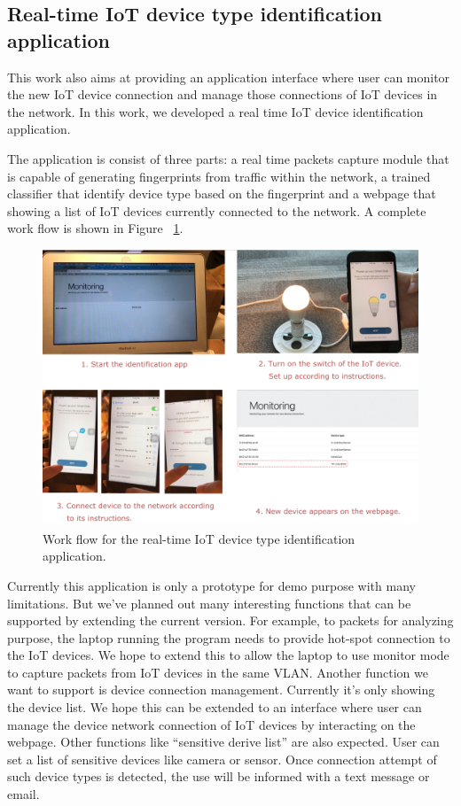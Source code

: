\documentclass[twocolumn,10pt]{article}
\begin{document}
\subsection{Real-time IoT device type identification application}

This work also aims at providing an application interface where user can monitor the new IoT device connection and manage those connections of IoT devices in the network. In this work, we developed a real time IoT device identification application. 

The application is consist of three parts:  a real time packets capture module that is capable of generating fingerprints from traffic within the network, a trained classifier that identify device type based on the fingerprint and a webpage that showing a list of IoT devices currently connected to the network. A complete work flow is shown in Figure ~\ref{fig: demo}.

\begin{figure}[h]
  \centering
   \includegraphics[scale=0.3]{demo}
  \caption[Work flow for the real-time IoT device type identification application]{Work flow for the real-time IoT device type identification application.}
  \label{fig: demo}
\end{figure}

Currently this application is only a prototype for demo purpose with many limitations. But we’ve planned out many interesting functions that can be supported by extending the current version. For example, to packets for analyzing purpose, the laptop running the program needs to provide hot-spot connection to the IoT devices. We hope to extend this to allow the laptop to use monitor mode to capture packets from IoT devices in the same VLAN. Another function we want to support is device connection management. Currently it’s only showing the device list. We hope this can be extended to an interface where user can manage the device network connection of IoT devices by interacting on the webpage. Other functions like “sensitive derive list” are also expected. User can set a list of sensitive devices like camera or sensor. Once connection attempt of such device types is detected, the use will be informed with a text message or email. 
\end{document}
